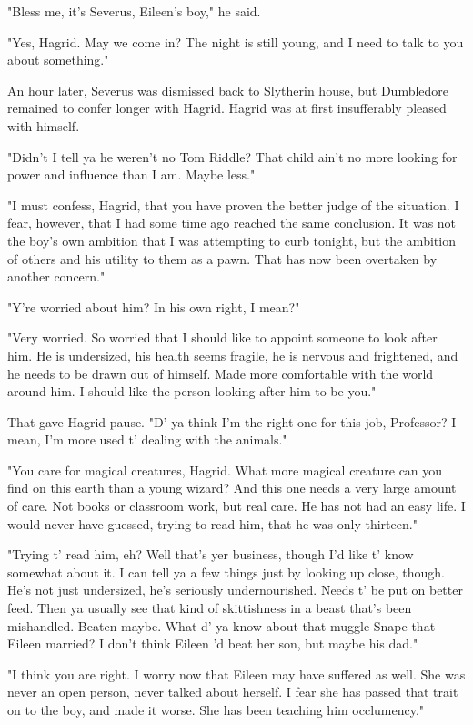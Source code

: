 "Bless me, it's Severus, Eileen's boy," he said.

"Yes, Hagrid. May we come in? The night is still young, and I need to talk to you about something."

An hour later, Severus was dismissed back to Slytherin house, but Dumbledore remained to confer longer with Hagrid. Hagrid was at first insufferably pleased with himself.

"Didn't I tell ya he weren't no Tom Riddle? That child ain't no more looking for power and influence than I am. Maybe less."

"I must confess, Hagrid, that you have proven the better judge of the situation. I fear, however, that I had some time ago reached the same conclusion. It was not the boy's own ambition that I was attempting to curb tonight, but the ambition of others and his utility to them as a pawn. That has now been overtaken by another concern."

"Y're worried about him? In his own right, I mean?"

"Very worried. So worried that I should like to appoint someone to look after him. He is undersized, his health seems fragile, he is nervous and frightened, and he needs to be drawn out of himself. Made more comfortable with the world around him. I should like the person looking after him to be you."

That gave Hagrid pause. "D' ya think I'm the right one for this job, Professor? I mean, I'm more used t' dealing with the animals."

"You care for magical creatures, Hagrid. What more magical creature can you find on this earth than a young wizard? And this one needs a very large amount of care. Not books or classroom work, but real care. He has not had an easy life. I would never have guessed, trying to read him, that he was only thirteen."

"Trying t' read him, eh? Well that's yer business, though I'd like t' know somewhat about it. I can tell ya a few things just by looking up close, though. He's not just undersized, he's seriously undernourished. Needs t' be put on better feed. Then ya usually see that kind of skittishness in a beast that's been mishandled. Beaten maybe. What d' ya know about that muggle Snape that Eileen married? I don't think Eileen 'd beat her son, but maybe his dad."

"I think you are right. I worry now that Eileen may have suffered as well. She was never an open person, never talked about herself. I fear she has passed that trait on to the boy, and made it worse. She has been teaching him occlumency."

